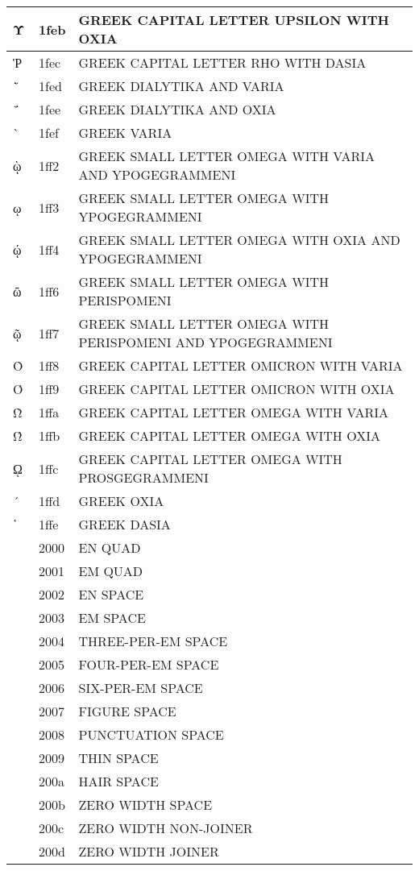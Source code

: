 \documentclass[12pt,letterpaper,openany]{book}
\begin{document}
\begin{center}
\begin{supertabular}{|m{0.25in}|m{0.5in}|m{4in}|}
Ύ & 1feb & GREEK CAPITAL LETTER UPSILON WITH OXIA\\\hline
Ῥ & 1fec & GREEK CAPITAL LETTER RHO WITH DASIA\\\hline
῭ & 1fed & GREEK DIALYTIKA AND VARIA\\\hline
΅ & 1fee & GREEK DIALYTIKA AND OXIA\\\hline
` & 1fef & GREEK VARIA\\\hline
ῲ & 1ff2 & GREEK SMALL LETTER OMEGA WITH VARIA AND YPOGEGRAMMENI\\\hline
ῳ & 1ff3 & GREEK SMALL LETTER OMEGA WITH YPOGEGRAMMENI\\\hline
ῴ & 1ff4 & GREEK SMALL LETTER OMEGA WITH OXIA AND YPOGEGRAMMENI\\\hline
ῶ & 1ff6 & GREEK SMALL LETTER OMEGA WITH PERISPOMENI\\\hline
ῷ & 1ff7 & GREEK SMALL LETTER OMEGA WITH PERISPOMENI AND YPOGEGRAMMENI\\\hline
Ὸ & 1ff8 & GREEK CAPITAL LETTER OMICRON WITH VARIA\\\hline
Ό & 1ff9 & GREEK CAPITAL LETTER OMICRON WITH OXIA\\\hline
Ὼ & 1ffa & GREEK CAPITAL LETTER OMEGA WITH VARIA\\\hline
Ώ & 1ffb & GREEK CAPITAL LETTER OMEGA WITH OXIA\\\hline
ῼ & 1ffc & GREEK CAPITAL LETTER OMEGA WITH PROSGEGRAMMENI\\\hline
´ & 1ffd & GREEK OXIA\\\hline
῾ & 1ffe & GREEK DASIA\\\hline
  & 2000 & EN QUAD\\\hline
  & 2001 & EM QUAD\\\hline
  & 2002 & EN SPACE\\\hline
  & 2003 & EM SPACE\\\hline
  & 2004 & THREE-PER-EM SPACE\\\hline
  & 2005 & FOUR-PER-EM SPACE\\\hline
  & 2006 & SIX-PER-EM SPACE\\\hline
  & 2007 & FIGURE SPACE\\\hline
  & 2008 & PUNCTUATION SPACE\\\hline
  & 2009 & THIN SPACE\\\hline
  & 200a & HAIR SPACE\\\hline
​ & 200b & ZERO WIDTH SPACE\\\hline
‌ & 200c & ZERO WIDTH NON-JOINER\\\hline
‍ & 200d & ZERO WIDTH JOINER\\\hline

\end{supertabular}
\end{center}
\end{document}
